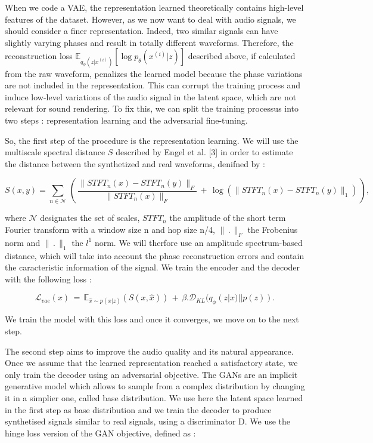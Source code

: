 \documentclass{article}
\begin{document}
When we code a VAE, the representation learned theoretically contains high-level features of the dataset. However, as we now want to deal with audio signals, we should consider a 
finer representation. Indeed, two similar signals can have slightly varying phases and result in totally different waveforms. Therefore, the reconstruction loss $\mathbb{E}_{q_\phi(z | x^{(i)})} [\log p_\theta(x^{(i)} | z)]$ 
described above, if calculated from the raw waveform, penalizes the learned model because the phase variations are not included in the representation. This can corrupt the training process and induce low-level variations of the audio signal in the latent space, which are not relevant for sound rendering. To fix this, we can split the training processus into two steps : representation learning and the adversarial fine-tuning.

So, the first step of the procedure is the representation learning. We will use the multiscale spectral distance $S$ described by Engel et al. [3] in order to estimate the distance between the synthetized and real waveforms, denifned by : 

\begin{equation} \label{spectral_dist}
    S(x,y) = \sum_{n \in \mathcal{N}}\, (\, \frac{\lVert STFT_n(x) - STFT_n(y) \rVert_F}{\lVert STFT_n(x) \rVert_F} \,+\, \log (\lVert STFT_n(x) - STFT_n(y) \rVert_1)   \,),
\end{equation}

where $\mathcal{N}$ designates the set of scales, $STFT_n$ the amplitude of the short term Fourier transform with a window size n and hop size n/4, $\lVert \,.\, \rVert_F$ the Frobenius norm and $\lVert \,.\, \rVert_1$ the $l^1$ norm. We will therfore use an amplitude spectrum-based distance, which will take into account the phase reconstruction errors and contain the caracteristic information of the signal.
We train the encoder and the decoder with the following loss :

\begin{equation}
    \mathcal{L}_{vae} (x) \,=\, \mathbb{E}_{\hat{x} \sim p(x|z)}(S(x,\hat x)) \,+\, \beta . \mathcal{D}_{KL}(q_\phi (z|x)||p(z)).
\end{equation}

We train the model with this loss and once it converges, we move on to the next step.

The second step aims to improve the audio quality and its natural appearance. Once we assume that the learned representation reached a satisfactory state, we only train the decoder using an adversarial objective. The GANs are an implicit generative model which allows to sample from a complex distribution by changing it in a simplier one, called base distribution. We use here the latent space learned in the first step as base distribution and we train the decoder to produce synthetised signals similar to real signals, using a discriminator D. We use the hinge loss version of the GAN objective, defined as :
\end{document}
